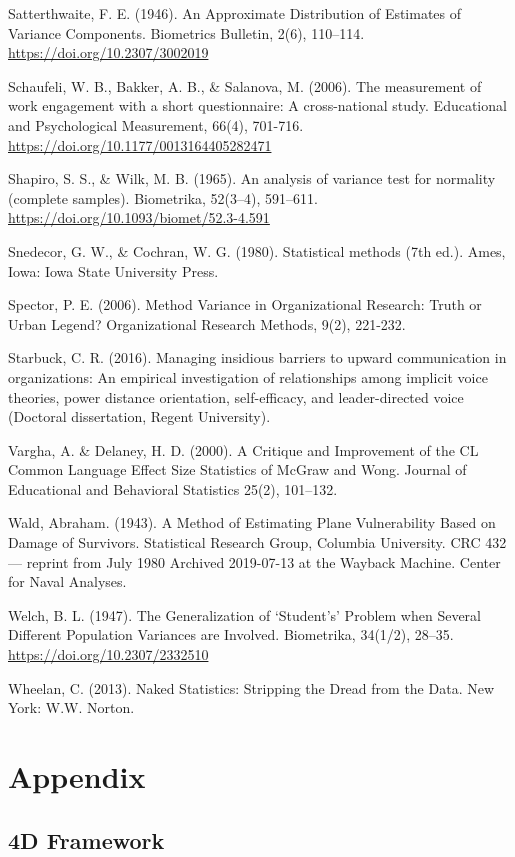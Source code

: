\documentclass[
]{book}
\begin{document}
Satterthwaite, F. E. (1946). An Approximate Distribution of Estimates of Variance Components. Biometrics Bulletin, 2(6), 110--114. \url{https://doi.org/10.2307/3002019}

Schaufeli, W. B., Bakker, A. B., \& Salanova, M. (2006). The measurement of work engagement with a short questionnaire: A cross-national study. Educational and Psychological Measurement, 66(4), 701-716. \url{https://doi.org/10.1177/0013164405282471}

Shapiro, S. S., \& Wilk, M. B. (1965). An analysis of variance test for normality (complete samples). Biometrika, 52(3--4), 591--611. \url{https://doi.org/10.1093/biomet/52.3-4.591}

Snedecor, G. W., \& Cochran, W. G. (1980). Statistical methods (7th ed.). Ames, Iowa: Iowa State University Press.

Spector, P. E. (2006). Method Variance in Organizational Research: Truth or Urban Legend? Organizational Research Methods, 9(2), 221-232.

Starbuck, C. R. (2016). Managing insidious barriers to upward communication in organizations: An empirical investigation of relationships among implicit voice theories, power distance orientation, self-efficacy, and leader-directed voice (Doctoral dissertation, Regent University).

Vargha, A. \& Delaney, H. D. (2000). A Critique and Improvement of the CL Common Language Effect Size Statistics of McGraw and Wong. Journal of Educational and Behavioral Statistics 25(2), 101--132.

Wald, Abraham. (1943). A Method of Estimating Plane Vulnerability Based on Damage of Survivors. Statistical Research Group, Columbia University. CRC 432 --- reprint from July 1980 Archived 2019-07-13 at the Wayback Machine. Center for Naval Analyses.

Welch, B. L. (1947). The Generalization of `Student's' Problem when Several Different Population Variances are Involved. Biometrika, 34(1/2), 28--35. \url{https://doi.org/10.2307/2332510}

Wheelan, C. (2013). Naked Statistics: Stripping the Dread from the Data. New York: W.W. Norton.

\hypertarget{appendix}{%
\chapter{Appendix}\label{appendix}}

\hypertarget{d-framework-1}{%
\section{4D Framework}\label{d-framework-1}}
\end{document}
